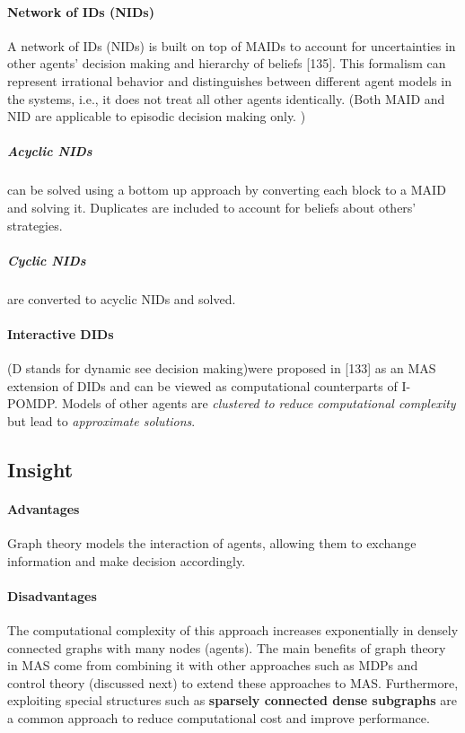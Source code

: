 \documentclass{article}
\begin{document}
				\paragraph{Network of IDs (NIDs)} A network of IDs (NIDs) is built on top of MAIDs to account for uncertainties in other agents’ decision making and hierarchy of beliefs  \citet{rizk-2018-decision-making-in-multiagent-systems-a-survey}[135]. This formalism can represent irrational behavior and distinguishes between different agent models in the systems, i.e., it does not treat all other
				agents identically. (Both MAID and NID are applicable to episodic decision making only. )
					\subparagraph{Acyclic NIDs} can be solved using a bottom up approach by converting each block to a MAID and
					solving it. Duplicates are included to account for beliefs about others’ strategies.
					\subparagraph{Cyclic NIDs} are converted to acyclic NIDs and solved.
				\paragraph{Interactive DIDs} (D stands for dynamic see decision making)were proposed in  \citet{rizk-2018-decision-making-in-multiagent-systems-a-survey}[133] as an MAS extension of DIDs and can be
				viewed as computational counterparts of I-POMDP. Models of other agents are \textit{clustered to reduce computational complexity} but lead to \textit{approximate solutions}.
			\subsection{Insight} 
				
				\paragraph{Advantages} Graph theory models the interaction of agents, allowing them to exchange information and make decision accordingly. 
				
				\paragraph{Disadvantages} The computational complexity of this approach increases exponentially in densely connected graphs with many nodes (agents). The main benefits of graph theory in MAS come from combining it with other approaches such as MDPs and control theory (discussed next) to extend these approaches to MAS. Furthermore, exploiting special structures such as \textbf{sparsely connected dense subgraphs} are a common approach to reduce computational cost and improve performance.
			
\end{document}
